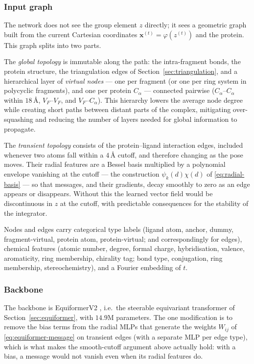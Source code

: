 \documentclass[a4paper,12pt]{article}
\theoremstyle{remark}
\begin{document}
\subsubsection{Input graph}

The network does not see the group element $z$ directly; it sees a geometric graph built from the
current Cartesian coordinates $\mathbf{x}^{(t)} = \varphi(z^{(t)})$ and the protein. This graph
splits into two parts.

The \emph{global topology} is immutable along the path: the intra-fragment bonds, the protein
structure, the triangulation edges of Section~\ref{sec:triangulation}, and a hierarchical layer of
\emph{virtual nodes} --- one per fragment (or one per ring system in polycyclic fragments), and one
per protein $C_\alpha$ --- connected pairwise ($C_\alpha$--$C_\alpha$ within $18\,\text{\AA}$,
$V_F$--$V_F$, and $V_F$--$C_\alpha$). This hierarchy lowers the average node degree while creating
short paths between distant parts of the complex, mitigating over-squashing and reducing the number
of layers needed for global information to propagate.

The \emph{transient topology} consists of the protein--ligand interaction edges, included whenever
two atoms fall within a $4\,\text{\AA}$ cutoff, and therefore changing as the pose moves. Their
radial features are a Bessel basis multiplied by a polynomial envelope vanishing at the cutoff ---
the construction $\psi_k(d)\chi(d)$ of \eqref{eq:radial-basis} --- so that messages, and their
gradients, decay smoothly to zero as an edge appears or disappears. Without this the learned vector
field would be discontinuous in $z$ at the cutoff, with predictable consequences for the stability
of the integrator.

Nodes and edges carry categorical type labels (ligand atom, anchor, dummy, fragment-virtual, protein
atom, protein-virtual; and correspondingly for edges), chemical features (atomic number, degree,
formal charge, hybridisation, valence, aromaticity, ring membership, chirality tag; bond type,
conjugation, ring membership, stereochemistry), and a Fourier embedding of $t$.

\subsubsection{Backbone}

The backbone is EquiformerV2 \cite{bortoliRiemannianScoreBasedGenerative2022}, i.e.\ the steerable equivariant
transformer of Section~\ref{sec:equiformer}, with $14.9\mathrm{M}$ parameters. The one modification
is to remove the bias terms from the radial MLPs that generate the weights $W_{ij}$ of
\eqref{eq:equiformer-message} on transient edges (with a separate MLP per edge type), which is what
makes the smooth-cutoff argument above actually hold: with a bias, a message would not vanish even
when its radial features do.
\end{document}
